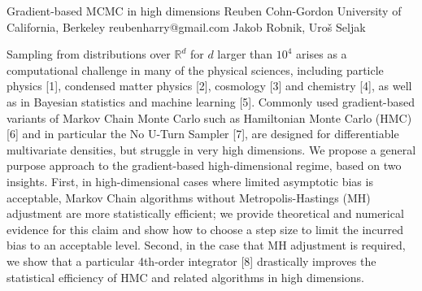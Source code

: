 \begin{talk}
  {Gradient-based MCMC in high dimensions}%
  {Reuben Cohn-Gordon}%
  {University of California, Berkeley}%
  {reubenharry@gmail.com}%
  {Jakob Robnik, Uro\v{s} Seljak}%
  
    
   
Sampling from distributions over $\mathbb{R}^d$ for $d$ larger than $10^4$ arises as a computational challenge in many of the physical sciences, including particle physics [1], condensed matter physics [2], cosmology [3] and chemistry [4], as well as in Bayesian statistics and machine learning [5]. Commonly used gradient-based variants of Markov Chain Monte Carlo such as Hamiltonian Monte Carlo (HMC) [6] and in particular the No U-Turn Sampler [7], are designed for differentiable multivariate densities, but struggle in very high dimensions. 
We propose a general purpose approach to the gradient-based high-dimensional regime, based on two insights. First, in high-dimensional cases where limited asymptotic bias is acceptable, Markov Chain algorithms without Metropolis-Hastings (MH) adjustment are more statistically efficient; we provide theoretical and numerical evidence for this claim and show how to choose a step size to limit the incurred bias to an acceptable level. Second, in the case that MH adjustment is required, we show that a particular 4th-order integrator [8] drastically improves the statistical efficiency of HMC and related algorithms in high dimensions.


\medskip


\end{talk}
